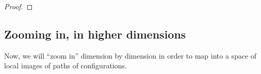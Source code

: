 \documentclass[12pt]{amsart}
\theoremstyle{plain}
\theoremstyle{definition}
\theoremstyle{remark}
\DeclareMathOperator{\UConf}{UConf}
\DeclareMathOperator{\id}{id}
\newcommand{\C}{\mathcal{C}}
\begin{document}
\begin{proof}
\end{proof}

\subsection{Zooming in, in higher dimensions}
Now, we will ``zoom in'' dimension by dimension in order to map into a space of local images of paths of configurations.
\end{document}
